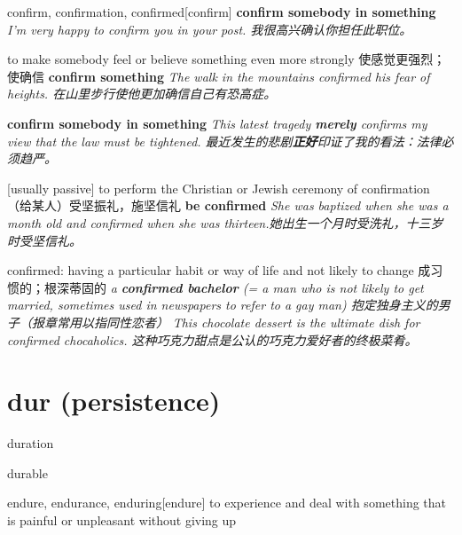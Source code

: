 \begin{DefWord}{confirm, confirmation, confirmed}[confirm]
    \textbf{confirm somebody in something} \textit{I'm very happy to confirm you in your post. 我很高兴确认你担任此职位。}

    to make somebody feel or believe something even more strongly 使感觉更强烈；使确信
    \textbf{confirm something} \textit{The walk in the mountains confirmed his fear of heights. 在山里步行使他更加确信自己有恐高症。}

    \textbf{confirm somebody in something} \textit{This latest tragedy \textbf{merely} confirms my view that the law must be tightened. 最近发生的悲剧\textbf{正好}印证了我的看法：法律必须趋严。}

    [usually passive] to perform the Christian or Jewish ceremony of confirmation （给某人）受坚振礼，施坚信礼
    \textbf{be confirmed} \textit{ She was baptized when she was a month old and confirmed when she was thirteen.她出生一个月时受洗礼，十三岁时受坚信礼。}
        
    confirmed: having a particular habit or way of life and not likely to change 成习惯的；根深蒂固的
    \textit{a \textbf{confirmed bachelor} (= a man who is not likely to get married, sometimes used in newspapers to refer to a gay man) 抱定独身主义的男子（报章常用以指同性恋者）}
    \textit{This chocolate dessert is the ultimate dish for confirmed chocaholics. 这种巧克力甜点是公认的巧克力爱好者的终极菜肴。}


\end{DefWord}

\section{dur (persistence)}

\begin{DefWord}{duration}
\end{DefWord}

\begin{DefWord}{durable}
\end{DefWord}


\begin{DefWord}{endure, endurance, enduring}[endure]
    to experience and deal with something that is painful or unpleasant without giving up
\end{DefWord}
